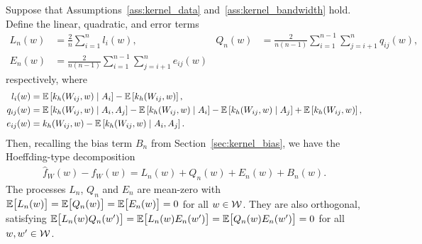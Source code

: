 \begin{lemma}
  \label{lem:hoeffding}

  Suppose that Assumptions~\ref{ass:kernel_data} and~\ref{ass:kernel_bandwidth}
  hold. Define the linear, quadratic, and error terms
  \begin{align*}
    L_n(w)
    &=
    \frac{2}{n} \sum_{i=1}^n l_i(w),
    &Q_n(w) &= \frac{2}{n(n-1)} \sum_{i=1}^{n-1} \sum_{j=i+1}^{n} q_{i j}(w), \\
    E_n(w) &= \frac{2}{n(n-1)} \sum_{i=1}^{n-1} \sum_{j=i+1}^{n} e_{i j}(w)
  \end{align*}
  respectively, where
  \begin{align*}
    l_i(w)
    &=
    \mathbb{E}\left[k_h(W_{i j},w) \mid A_i\right] - \mathbb{E}\left[k_h(W_{i j},w)\right], \\
    q_{i j}(w)
    &=
    \mathbb{E}\left[k_h(W_{i j},w) \mid A_i, A_j\right]
    - \mathbb{E}\left[k_h(W_{i j},w) \mid A_i\right]
    - \mathbb{E}\left[k_h(W_{i j},w) \mid A_j\right]
    + \mathbb{E}\left[k_h(W_{i j},w)\right], \\
    e_{i j}(w)
    &=
    k_h(W_{i j},w) - \mathbb{E}\left[k_h(W_{i j},w) \mid A_i, A_j\right].
  \end{align*}
  Then, recalling the bias term $B_n$ from Section~\ref{sec:kernel_bias},
  we have the Hoeffding-type decomposition
  \begin{align}
    \label{eq:h-decomposition}
    \hat f_W(w) - f_W(w) = L_n(w) + Q_n(w) + E_n(w) + B_n(w).
  \end{align}
  The processes $L_n$, $Q_n$ and $E_n$ are mean-zero
  with $\mathbb{E}\big[L_n(w)\big] = \mathbb{E}\big[Q_n(w)\big] = \mathbb{E}\big[E_n(w)\big] = 0$
  for all $w \in \mathcal{W}$. They are also orthogonal,
  satisfying $\mathbb{E}\big[ L_n(w) Q_n(w') \big] = \mathbb{E}\big[ L_n(w) E_n(w') \big]
  = \mathbb{E}\big[ Q_n(w) E_n(w') \big] = 0$ for all $w, w' \in \mathcal{W}$.
\end{lemma}

